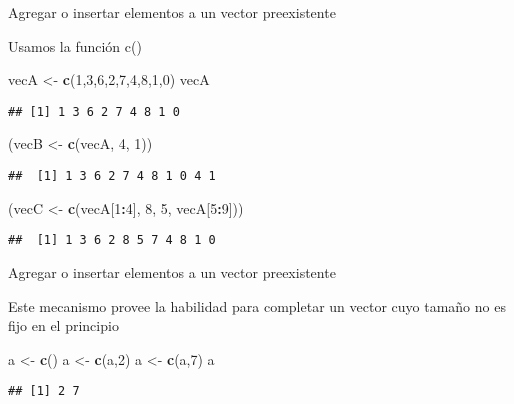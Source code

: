 \documentclass[ignorenonframetext,]{beamer}
\newenvironment{Shaded}{\begin{snugshade}}{\end{snugshade}}
\newcommand{\KeywordTok}[1]{\textcolor[rgb]{0.13,0.29,0.53}{\textbf{#1}}}
\newcommand{\DecValTok}[1]{\textcolor[rgb]{0.00,0.00,0.81}{#1}}
\newcommand{\StringTok}[1]{\textcolor[rgb]{0.31,0.60,0.02}{#1}}
\newcommand{\OperatorTok}[1]{\textcolor[rgb]{0.81,0.36,0.00}{\textbf{#1}}}
\newcommand{\NormalTok}[1]{#1}
\begin{document}
\begin{frame}[fragile]{Agregar o insertar elementos a un vector
preexistente}

Usamos la función c()

\begin{Shaded}
\begin{Highlighting}[]
\NormalTok{vecA <-}\StringTok{ }\KeywordTok{c}\NormalTok{(}\DecValTok{1}\NormalTok{,}\DecValTok{3}\NormalTok{,}\DecValTok{6}\NormalTok{,}\DecValTok{2}\NormalTok{,}\DecValTok{7}\NormalTok{,}\DecValTok{4}\NormalTok{,}\DecValTok{8}\NormalTok{,}\DecValTok{1}\NormalTok{,}\DecValTok{0}\NormalTok{)}
\NormalTok{vecA}
\end{Highlighting}
\end{Shaded}
\pause
\begin{verbatim}
## [1] 1 3 6 2 7 4 8 1 0
\end{verbatim}

\begin{Shaded}
\begin{Highlighting}[]
\NormalTok{(vecB <-}\StringTok{ }\KeywordTok{c}\NormalTok{(vecA, }\DecValTok{4}\NormalTok{, }\DecValTok{1}\NormalTok{))}
\end{Highlighting}
\end{Shaded}
\pause
\begin{verbatim}
##  [1] 1 3 6 2 7 4 8 1 0 4 1
\end{verbatim}

\begin{Shaded}
\begin{Highlighting}[]
\NormalTok{(vecC <-}\StringTok{ }\KeywordTok{c}\NormalTok{(vecA[}\DecValTok{1}\OperatorTok{:}\DecValTok{4}\NormalTok{], }\DecValTok{8}\NormalTok{, }\DecValTok{5}\NormalTok{, vecA[}\DecValTok{5}\OperatorTok{:}\DecValTok{9}\NormalTok{]))}
\end{Highlighting}
\end{Shaded}
\pause
\begin{verbatim}
##  [1] 1 3 6 2 8 5 7 4 8 1 0
\end{verbatim}

\end{frame}

\begin{frame}[fragile]{Agregar o insertar elementos a un vector
preexistente}

Este mecanismo provee la habilidad para completar un vector cuyo tamaño
no es fijo en el principio

\begin{Shaded}
\begin{Highlighting}[]
\NormalTok{a <-}\StringTok{ }\KeywordTok{c}\NormalTok{()}
\NormalTok{a <-}\StringTok{ }\KeywordTok{c}\NormalTok{(a,}\DecValTok{2}\NormalTok{)}
\NormalTok{a <-}\StringTok{ }\KeywordTok{c}\NormalTok{(a,}\DecValTok{7}\NormalTok{)}
\NormalTok{a}
\end{Highlighting}
\end{Shaded}
\pause
\begin{verbatim}
## [1] 2 7
\end{verbatim}

\end{frame}
\end{document}
